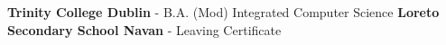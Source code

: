 
\begin{scholarship}
   {\textbf {Trinity College Dublin} - B.A. (Mod) Integrated Computer Science}
					{ \textbf{Loreto Secondary School Navan} - Leaving Certificate}
\end{scholarship}